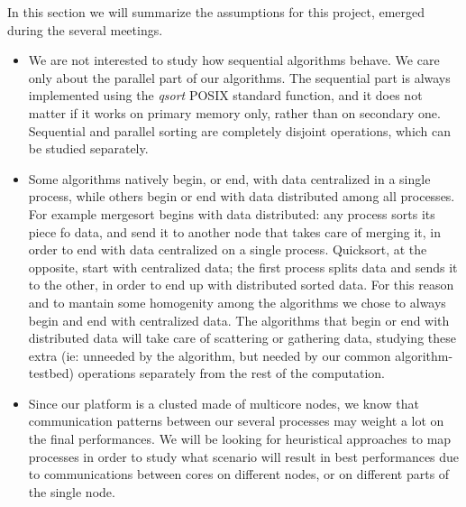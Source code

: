 In this section we will summarize the assumptions for this project, emerged during the several meetings.
\begin{itemize}
	\item{We are not interested to study how sequential algorithms behave. We care only about the parallel part of our algorithms. The sequential part is always implemented using the \textit{qsort} POSIX standard function, and it does not matter if it works on primary memory only, rather than on secondary one. Sequential and parallel sorting are completely disjoint operations, which can be studied separately.}
	\item{Some algorithms natively begin, or end, with data centralized in a single process, while others begin or end with data distributed among all processes. For example mergesort begins with data distributed: any process sorts its piece fo data, and send it to another node that takes care of merging it, in order to end with data centralized on a single process. Quicksort, at the opposite, start with centralized data; the first process splits data and sends it to the other, in order to end up with distributed sorted data. For this reason and to mantain some homogenity among the algorithms we chose to always begin and end with centralized data. The algorithms that begin or end with distributed data will take care of scattering or gathering data, studying these extra (ie: unneeded by the algorithm, but needed by our common algorithm-testbed) operations separately from the rest of the computation.}
	\item{Since our platform is a clusted made of multicore nodes, we know that communication patterns between our several processes may weight a lot on the final performances. We will be looking for heuristical approaches to map processes in order to study what scenario will result in best performances due to communications between cores on different nodes, or on different parts of the single node.}
\end{itemize}

